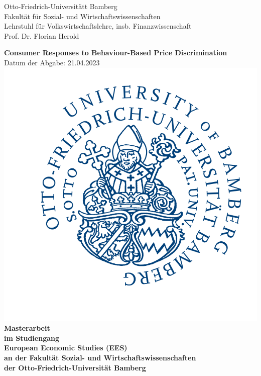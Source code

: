 \documentclass[a4paper, 11 pt, fleqn]{article}
\begin{document}
\begin{titlepage}
	\noindent
	Otto-Friedrich-Universitätt Bamberg\\
	Fakult\"at f\"ur Sozial- und Wirtschaftswissenschaften\\
	Lehrstuhl f\"ur Volkswirtschaftslehre, insb. Finanzwissenschaft\\
	Prof. Dr. Florian Herold
	
	\begin{center}
		\vspace{2 cm}
		\Large{
			\textbf{
		Consumer Responses to Behaviour-Based Price Discrimination
		}}\\ 
		\vspace{0.5 cm}
		\normalsize{Datum der Abgabe: 21.04.2023}\\
		\vspace{1 cm}
		\includegraphics[scale=0.175]{graphics/logo.png}\\
		\vspace{1 cm}	
		\textbf{Masterarbeit \\
		im Studiengang \\
		European Economic Studies (EES) \\
		an der Fakultät Sozial- und Wirtschaftswissenschaften \\
		der Otto-Friedrich-Universität Bamberg}\\
	\end{center}
	
	\vspace{5cm}
\end{titlepage}
\end{document}
